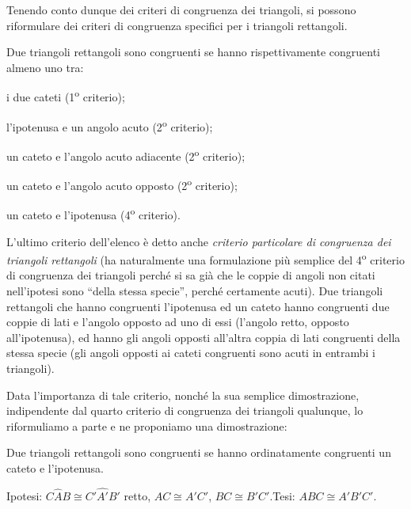 Tenendo conto dunque dei criteri di congruenza dei triangoli, si 
possono riformulare dei criteri di congruenza specifici per i 
triangoli rettangoli.

\begin{teorema}
Due triangoli rettangoli sono congruenti se hanno rispettivamente 
congruenti almeno uno tra:
\begin{itemize*}
\item i due cateti (1\textsuperscript{o} criterio);
\item l'ipotenusa e un angolo acuto (2\textsuperscript{o} criterio);
\item un cateto e l'angolo acuto adiacente (2\textsuperscript{o} 
criterio);
\item un cateto e l'angolo acuto opposto (2\textsuperscript{o} 
criterio);
\item un cateto e l'ipotenusa (4\textsuperscript{o} criterio).
\end{itemize*}
\end{teorema}

L'ultimo criterio dell'elenco è detto anche \emph{criterio 
particolare di congruenza dei triangoli rettangoli} (ha naturalmente 
una formulazione più semplice del 4\textsuperscript{o} criterio di 
congruenza dei triangoli perché si sa già che le coppie di angoli non 
citati nell'ipotesi sono ``della stessa specie'', perché certamente 
acuti). Due triangoli rettangoli che hanno congruenti l'ipotenusa ed 
un cateto hanno congruenti due coppie di lati e l'angolo opposto ad 
uno di essi (l'angolo retto, opposto all'ipotenusa), ed hanno gli 
angoli opposti all'altra coppia di lati congruenti della stessa 
specie (gli angoli opposti ai cateti congruenti sono acuti in entrambi 
i triangoli). 

Data l'importanza di tale criterio, nonché la sua semplice 
dimostrazione, indipendente dal quarto criterio di congruenza dei 
triangoli qualunque, lo riformuliamo a parte e ne proponiamo una 
dimostrazione:
\begin{teorema}
Due triangoli rettangoli sono congruenti se hanno ordinatamente 
congruenti un cateto e l'ipotenusa.
\end{teorema}

\noindent Ipotesi: $C\widehat{A}B\cong C'\widehat{A'}B'$ retto, 
$AC\cong A'C'$, $BC\cong B'C'$.\tab\tab Tesi: $ABC\cong A'B'C'$.


\begin{inaccessibleblock}
 \begin{figure}[htb]
\centering
\end{figure}
\end{inaccessibleblock}

